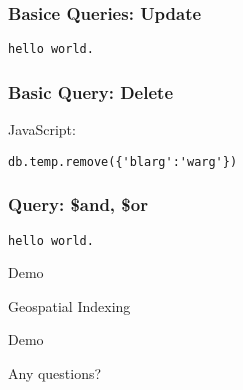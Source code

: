 \documentclass{beamer}
\begin{document}
\begin{frame}[fragile]

\frametitle{Basice Queries: Update}

\begin{lstlisting}
hello world.
\end{lstlisting}

\end{frame}


\begin{frame}[fragile]

\frametitle{Basic Query: Delete}

JavaScript:
\begin{lstlisting}
db.temp.remove({'blarg':'warg'})
\end{lstlisting}

\end{frame}


\begin{frame}[fragile]

\frametitle{Query: \$and, \$or}

\begin{lstlisting}
hello world.
\end{lstlisting}

\end{frame}


\begin{frame}%

\begin{center}
   Demo
\end{center}

\end{frame}


\begin{frame}{Geospatial Indexing}
\end{frame}


\begin{frame}%

\begin{center}
   Demo
\end{center}

\end{frame}





\begin{frame} %

\begin{center}
   Any questions?
\end{center}

\end{frame}
\end{document}
